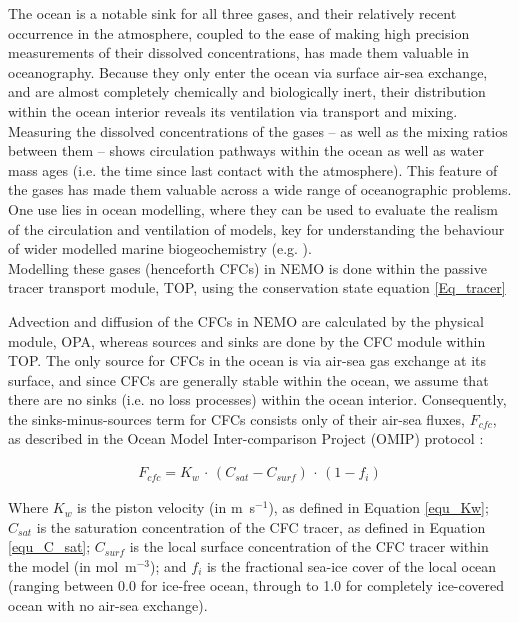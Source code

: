 \documentclass[../main/TOP_manual]{subfiles}
\begin{document}
The ocean is a notable sink for all three gases, and their relatively recent occurrence in the atmosphere, coupled to the ease of making high precision measurements of their dissolved concentrations, has made them
valuable in oceanography. %
Because they only enter the ocean via surface air-sea exchange, and are almost completely chemically and biologically inert, their distribution within the ocean interior reveals its ventilation via transport and mixing.
Measuring the dissolved concentrations of the gases -- as well as the mixing ratios between them -- shows circulation pathways within the ocean as well as water mass ages (i.e. the time since last contact with the
atmosphere). This feature of the gases has made them valuable across a wide range of oceanographic problems. One use lies in ocean modelling, where they can be used to evaluate the realism of the circulation and
ventilation of models, key for understanding the behaviour of wider modelled marine biogeochemistry (e.g. \citep{dutay_2002,palmieri_2015}). \\

Modelling these gases (henceforth CFCs) in NEMO is done within the passive tracer transport module, TOP, using the conservation state equation \ref{Eq_tracer}

Advection and diffusion of the CFCs in NEMO are calculated by the physical module, OPA,
whereas sources and sinks are done by the CFC module within TOP.
The only source for CFCs in the ocean is via air-sea gas exchange at its surface, and since CFCs are generally
stable within the ocean, we assume that there are no sinks (i.e. no loss processes) within the ocean interior.
Consequently, the sinks-minus-sources term for CFCs consists only of their air-sea fluxes, $F_{cfc}$, as
described in the Ocean Model Inter-comparison Project (OMIP) protocol \citep{orr_2017}:


\begin{eqnarray}
F_{cfc} = K_{w} \, \cdot \, (C_{sat} - C_{surf}) \, \cdot  \, (1 - f_{i})
\label{equ_CFC_flux}
\end{eqnarray}

Where $K_{w}$ is the piston velocity (in m~s$^{-1}$), as defined in Equation \ref{equ_Kw};
$C_{sat}$ is the saturation concentration of the CFC tracer, as defined in Equation \ref{equ_C_sat};
$C_{surf}$ is the local surface concentration of the CFC tracer within the model (in mol~m$^{-3}$);
and $f_{i}$ is the fractional sea-ice cover of the local ocean (ranging between 0.0 for ice-free ocean,
through to 1.0 for completely ice-covered ocean with no air-sea exchange).
\end{document}
